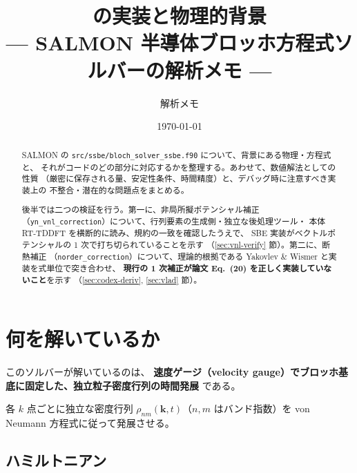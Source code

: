 \documentclass[dvipdfmx,a4paper,11pt]{jsarticle}
\title{\file{bloch\_solver\_ssbe.f90} の実装と物理的背景\\[2mm]
       \large --- SALMON \file{src/ssbe} 半導体ブロッホ方程式ソルバーの解析メモ ---}
\author{解析メモ}
\date{\today}
\newcommand{\file}[1]{\texttt{#1}}
\newcommand{\vk}{\bm{k}}
\begin{document}
\maketitle

\begin{abstract}
SALMON の \file{src/ssbe/bloch\_solver\_ssbe.f90} について、背景にある物理・方程式と、
それがコードのどの部分に対応するかを整理する。あわせて、数値解法としての性質
（厳密に保存される量、安定性条件、時間精度）と、デバッグ時に注意すべき実装上の
不整合・潜在的な問題点をまとめる。

後半では二つの検証を行う。第一に、非局所擬ポテンシャル補正
（\file{yn\_vnl\_correction}）について、行列要素の生成側・独立な後処理ツール・
本体 RT-TDDFT を横断的に読み、規約の一致を確認したうえで、
SBE 実装がベクトルポテンシャルの 1 次で打ち切られていることを示す
（\ref{sec:vnl-verify} 節）。第二に、断熱補正
（\file{norder\_correction}）について、理論的根拠である
Yakovlev \& Wismer \cite{yakovlev2017} と実装を式単位で突き合わせ、
\textbf{現行の 1 次補正が論文 Eq.~(20) を正しく実装していないこと}を示す
（\ref{sec:codex-deriv}, \ref{sec:vlad} 節）。
\end{abstract}

\tableofcontents

\section{何を解いているか}

このソルバーが解いているのは、
\textbf{速度ゲージ（velocity gauge）でブロッホ基底に固定した、独立粒子密度行列の時間発展}
である。

各 $k$ 点ごとに独立な密度行列 $\rho_{nm}(\vk,t)$（$n,m$ はバンド指数）を
von Neumann 方程式に従って発展させる。

\subsection{ハミルトニアン}
\end{document}
